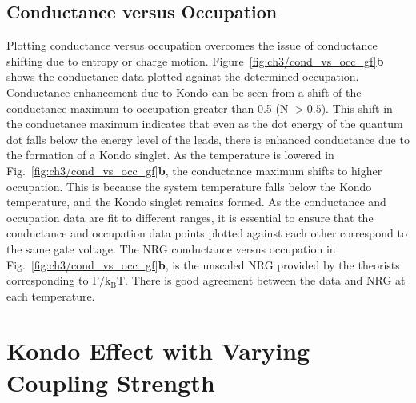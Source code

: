 \subsection{Conductance versus Occupation}

Plotting conductance versus occupation overcomes the issue of conductance shifting due to entropy or charge motion. Figure~\ref{fig:ch3/cond_vs_occ_gf}\textbf{b} shows the conductance data plotted against the determined occupation. Conductance enhancement due to Kondo can be seen from a shift of the conductance maximum to occupation greater than 0.5 (N $>0.5$). This shift in the conductance maximum indicates that even as the dot energy of the quantum dot falls below the energy level of the leads, there is enhanced conductance due to the formation of a Kondo singlet. As the temperature is lowered in Fig.~\ref{fig:ch3/cond_vs_occ_gf}\textbf{b}, the conductance maximum shifts to higher occupation. This is because the system temperature falls below the Kondo temperature, and the Kondo singlet remains formed. As the conductance and occupation data are fit to different ranges, it is essential to ensure that the conductance and occupation data points plotted against each other correspond to the same gate voltage. The NRG conductance versus occupation in Fig.~\ref{fig:ch3/cond_vs_occ_gf}\textbf{b}, is the unscaled NRG provided by the theorists corresponding to $\mathrm{\Gamma/k_BT}$. There is good agreement between the data and NRG at each temperature. 



\section{Kondo Effect with Varying Coupling Strength}




